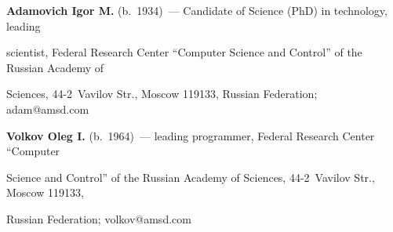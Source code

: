\vspace*{-3pt}





\noindent


\textbf{Adamovich Igor M.} (b.\ 1934)~--- Candidate of Science (PhD) in technology, leading 


scientist, Federal Research Center ``Computer Science and Control'' of the Russian Academy of 


Sciences, 44-2~Vavilov Str., Moscow 119133, Russian Federation; \mbox{adam@amsd.com}





\vspace*{3pt}





\noindent


\textbf{Volkov Oleg I.} (b.\ 1964)~--- leading programmer, Federal Research Center ``Computer 


Science and Control'' of the Russian Academy of Sciences, 44-2~Vavilov Str., Moscow 119133, 


Russian Federation; \mbox{volkov@amsd.com}





  


\label{end\stat}





\renewcommand{\bibname}{\protect\rm Литература}    


   


